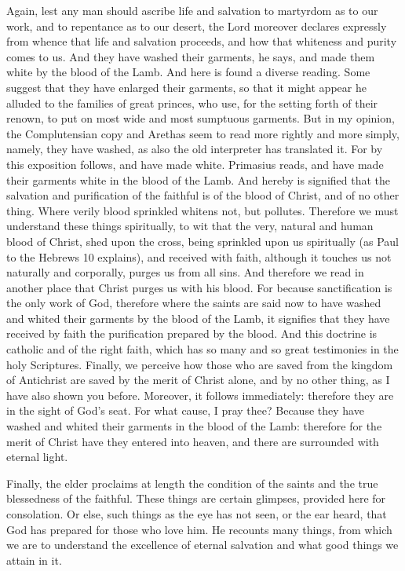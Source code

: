 Again, lest any man should ascribe life and salvation to martyrdom as to our work, and to repentance as to our desert, the Lord moreover declares expressly from whence that life and salvation proceeds, and how that whiteness and purity comes to us. And they have washed their garments, he says, and made them white by the blood of the Lamb. And here is found a diverse reading. Some suggest that they have enlarged their garments, so that it might appear he alluded to the families of great princes, who use, for the setting forth of their renown, to put on most wide and most sumptuous garments. But in my opinion, the Complutensian copy and Arethas seem to read more rightly and more simply, namely, they have washed, as also the old interpreter has translated it. For by this exposition follows, and have made white. Primasius reads, and have made their garments white in the blood of the Lamb. And hereby is signified that the salvation and purification of the faithful is of the blood of Christ, and of no other thing. Where verily blood sprinkled whitens not, but pollutes. Therefore we must understand these things spiritually, to wit that the very, natural and human blood of Christ, shed upon the cross, being sprinkled upon us spiritually (as Paul to the Hebrews 10 explains), and received with faith, although it touches us not naturally and corporally, purges us from all sins. And therefore we read in another place that Christ purges us with his blood. For because sanctification is the only work of God, therefore where the saints are said now to have washed and whited their garments by the blood of the Lamb, it signifies that they have received by faith the purification prepared by the blood. And this doctrine is catholic and of the right faith, which has so many and so great testimonies in the holy Scriptures. Finally, we perceive how those who are saved from the kingdom of Antichrist are saved by the merit of Christ alone, and by no other thing, as I have also shown you before. Moreover, it follows immediately: therefore they are in the sight of God’s seat. For what cause, I pray thee? Because they have washed and whited their garments in the blood of the Lamb: therefore for the merit of Christ have they entered into heaven, and there are surrounded with eternal light.

Finally, the elder proclaims at length the condition of the saints and the true blessedness of the faithful. These things are certain glimpses, provided here for consolation. Or else, such things as the eye has not seen, or the ear heard, that God has prepared for those who love him. He recounts many things, from which we are to understand the excellence of eternal salvation and what good things we attain in it.

